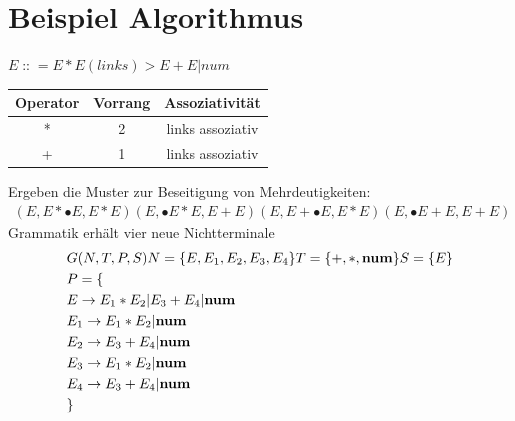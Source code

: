 \documentclass[t]{beamer}
\renewcommand{\Coloneqq}{\mathrel{\mathop{::}}=}
\begin{document}
	\section{Beispiel Algorithmus}\label{sec:beispiel-algorithmus}
	\begin{frame}
		$E \Coloneqq E * E (links) > E + E | num $
		\begin{tabular}{|c|c|c|}
			\hline
			Operator & Vorrang & Assoziativität   \\
			\hline
			*        & 2       & links assoziativ \\
			\hline
			+        & 1       & links assoziativ \\
			\hline
		\end{tabular}\label{tab:table3}
		Ergeben die Muster zur Beseitigung von Mehrdeutigkeiten:
		\begin{align*}
		(E, E*\bullet{E}, E*E)
		(E, \bullet{E}*E, E+E)
		(E, E+\bullet{E}, E*E)
		(E, \bullet{E}+E, E+E)
		\end{align*}
		Grammatik erhält vier neue Nichtterminale
		\begin{align*}
			& G(N,T,P,S) N= \{E, E_1, E_2, E_3, E_4\} T= \{+, *, \bold{num}\} S= \{E\} \\
			& P = \{ \\
			& E     \rightarrow E_1 * E_2 | E_3 + E_4 | \bold{num} \\
			& E_1   \rightarrow E_1 * E_2 | \bold{num} \\
			& E_2   \rightarrow E_3 + E_4 | \bold{num} \\
			& E_3   \rightarrow E_1 * E_2 | \bold{num} \\
			& E_4   \rightarrow E_3 + E_4 | \bold{num} \\
			& \}
		\end{align*}
	\end{frame}
\end{document}
